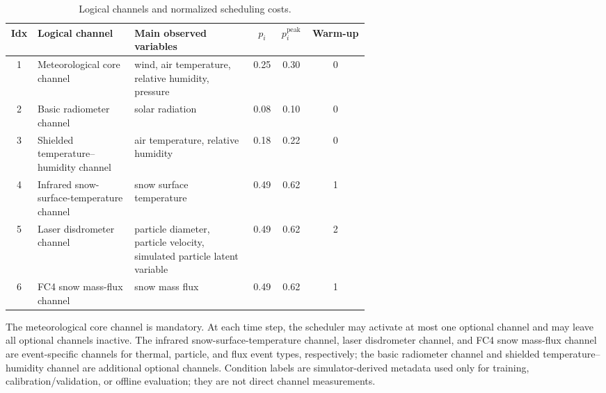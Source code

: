 \begin{table}[htbp]
  \centering
  \caption{Logical channels and normalized scheduling costs.}
  \label{tab:sensor_specs}
  \small
  \setlength{\tabcolsep}{3.5pt}
  \begin{tabular}{@{}c >{\raggedright\arraybackslash}p{0.27\linewidth} >{\raggedright\arraybackslash}p{0.33\linewidth} c c c@{}}
    \toprule
    Idx & Logical channel & Main observed variables
        & $p_i$ & $p_i^{\mathrm{peak}}$ & Warm-up \\
    \midrule
    1 & Meteorological core channel
      & wind, air temperature, relative humidity, pressure
      & 0.25 & 0.30 & 0 \\
    2 & Basic radiometer channel
      & solar radiation
      & 0.08 & 0.10 & 0 \\
    3 & Shielded temperature--humidity channel
      & air temperature, relative humidity
      & 0.18 & 0.22 & 0 \\
    4 & Infrared snow-surface-temperature channel
      & snow surface temperature
      & 0.49 & 0.62 & 1 \\
    5 & Laser disdrometer channel
      & particle diameter, particle velocity, simulated particle latent variable
      & 0.49 & 0.62 & 2 \\
    6 & FC4 snow mass-flux channel
      & snow mass flux
      & 0.49 & 0.62 & 1 \\
    \bottomrule
  \end{tabular}
  \vspace{0.5ex}

  \noindent\footnotesize
  The meteorological core channel is mandatory. At each time step, the scheduler may
  activate at most one optional channel and may leave all optional channels
  inactive. The infrared snow-surface-temperature channel, laser disdrometer channel,
  and FC4 snow mass-flux channel are
  event-specific channels for thermal, particle, and flux event types,
  respectively; the basic radiometer channel and shielded temperature--humidity channel
  are additional optional channels. Condition labels are simulator-derived metadata
  used only for training, calibration/validation, or offline evaluation; they are not
  direct channel measurements.
\end{table}
